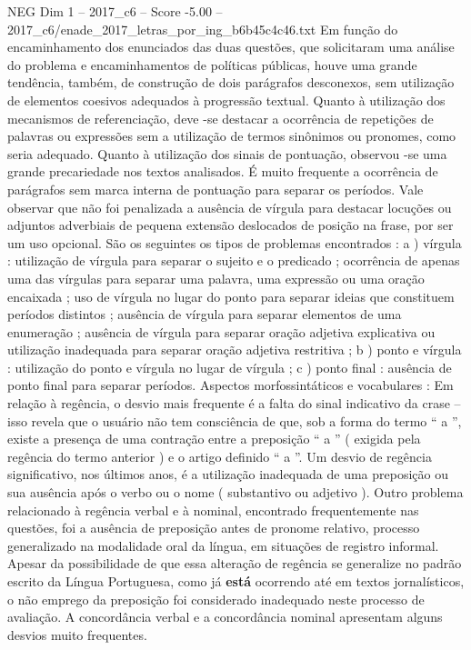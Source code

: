 \begin{textsample}{NEG Dim 1 – 2017\_c6 – Score -5.00 – 2017\_c6/enade\_2017\_letras\_por\_ing\_b6b45c4c46.txt}
Em função do encaminhamento dos enunciados das duas questões, que solicitaram uma análise do problema e encaminhamentos de políticas públicas, houve uma grande tendência, também, de construção de dois parágrafos desconexos, sem utilização de elementos coesivos adequados à progressão textual.
Quanto à utilização dos mecanismos de referenciação, deve -se destacar a ocorrência de repetições de palavras ou expressões sem a utilização de termos sinônimos ou pronomes, como seria adequado.
Quanto à utilização dos sinais de pontuação, observou -se uma grande precariedade nos textos analisados.
É muito frequente a ocorrência de parágrafos sem marca interna de pontuação para separar os períodos.
Vale observar que não foi penalizada a ausência de vírgula para destacar locuções ou adjuntos adverbiais de pequena extensão deslocados de posição na frase, por ser um uso opcional.
São os seguintes os tipos de problemas encontrados : a ) vírgula : utilização de vírgula para separar o sujeito e o predicado ; ocorrência de apenas uma das vírgulas para separar uma palavra, uma expressão ou uma oração encaixada ; uso de vírgula no lugar do ponto para separar ideias que constituem períodos distintos ; ausência de vírgula para separar elementos de uma enumeração ; ausência de vírgula para separar oração adjetiva explicativa ou utilização inadequada para separar oração adjetiva restritiva ; b ) ponto e vírgula : utilização do ponto e vírgula no lugar de vírgula ; c ) ponto final : ausência de ponto final para separar períodos.
Aspectos morfossintáticos e vocabulares : Em relação à regência, o desvio mais frequente é a falta do sinal indicativo da crase – isso revela que o usuário não tem consciência de que, sob a forma do termo “ a ”, existe a presença de uma contração entre a preposição “ a ” ( exigida pela regência do termo anterior ) e o artigo definido “ a ”.
Um desvio de regência significativo, nos últimos anos, é a utilização inadequada de uma preposição ou sua ausência após o verbo ou o nome ( substantivo ou adjetivo ).
Outro problema relacionado à regência verbal e à nominal, encontrado frequentemente nas questões, foi a ausência de preposição antes de pronome relativo, processo generalizado na modalidade oral da língua, em situações de registro informal.
Apesar da possibilidade de que essa alteração de regência se generalize no padrão escrito da Língua Portuguesa, como já \textbf{está} ocorrendo até em textos jornalísticos, o não emprego da preposição foi considerado inadequado neste processo de avaliação.
A concordância verbal e a concordância nominal apresentam alguns desvios muito frequentes.

\end{textsample}
